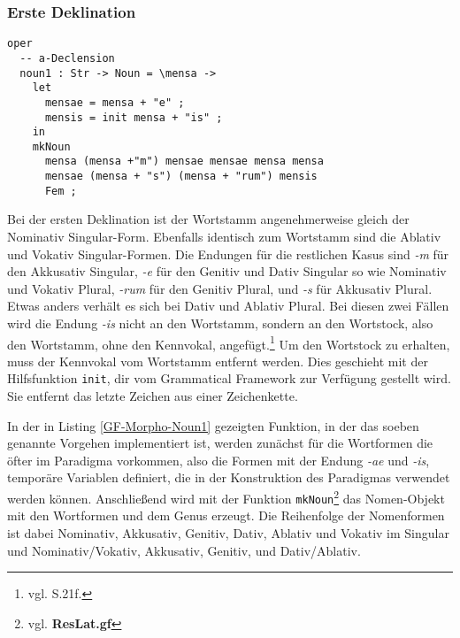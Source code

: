 \subsubsection{Erste Deklination}
\begin{lstlisting}[float=h!tp,caption={Deklinationsfunktion für die erste Deklination (vgl. \textbf{MorphoLat.gf})},label={GF-Morpho-Noun1}]
oper
  -- a-Declension
  noun1 : Str -> Noun = \mensa ->
    let 
      mensae = mensa + "e" ;
      mensis = init mensa + "is" ;
    in
    mkNoun 
      mensa (mensa +"m") mensae mensae mensa mensa
      mensae (mensa + "s") (mensa + "rum") mensis
      Fem ;
\end{lstlisting}
Bei der ersten Deklination ist der Wortstamm angenehmerweise gleich der Nominativ Singular-Form. Ebenfalls identisch zum Wortstamm sind die Ablativ und Vokativ Singular-Formen. Die Endungen für die restlichen Kasus sind \textit{-m} für den Akkusativ Singular, \textit{-e} für den Genitiv und Dativ Singular so wie Nominativ und Vokativ Plural, \textit{-rum} für den Genitiv Plural, und \textit{-s} für Akkusativ Plural. Etwas anders verhält es sich bei Dativ und Ablativ Plural. Bei diesen zwei Fällen wird die Endung \textit{-is} nicht an den Wortstamm, sondern an den Wortstock, also den Wortstamm, ohne den Kennvokal, angefügt.\footnote{vgl. \cite{BAYER-LINDAUER1994} S.21f.} Um den Wortstock zu erhalten, muss der Kennvokal vom Wortstamm entfernt werden. Dies geschieht mit der Hilfsfunktion \texttt{init}, dir vom Grammatical Framework zur Verfügung gestellt wird. Sie entfernt das letzte Zeichen aus einer Zeichenkette.\par
In der in Listing \ref{GF-Morpho-Noun1} gezeigten Funktion, in der das soeben genannte Vorgehen implementiert ist, werden zunächst für die Wortformen die öfter im Paradigma vorkommen, also die Formen mit der Endung \textit{-ae} und \textit{-is}, temporäre Variablen definiert, die in der Konstruktion des Paradigmas verwendet werden können. Anschließend wird mit der Funktion \texttt{mkNoun}\footnote{vgl. \textbf{ResLat.gf}} das Nomen-Objekt mit den Wortformen und dem Genus erzeugt. Die Reihenfolge der Nomenformen ist dabei Nominativ, Akkusativ, Genitiv, Dativ, Ablativ und Vokativ im Singular und Nominativ/Vokativ, Akkusativ, Genitiv, und Dativ/Ablativ. 
\par
\FloatBarrier
